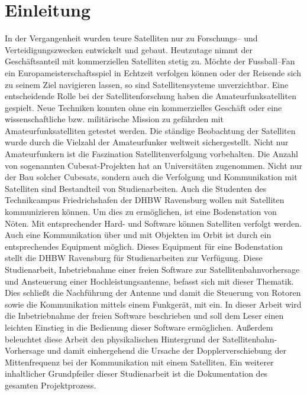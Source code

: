 
\chapter{Einleitung}
In der Vergangenheit wurden teure Satelliten nur zu Forschungs-- und Verteidigungszwecken entwickelt und gebaut. Heutzutage nimmt der 
Geschäftsanteil mit kommerziellen Satelliten stetig zu. Möchte der Fussball--Fan ein Europameisterschaftsspiel in Echtzeit verfolgen können oder der 
Reisende sich zu seinem Ziel navigieren lassen, so sind Satellitensysteme unverzichtbar.
\newpar
Eine entscheidende Rolle bei der Satellitenforschung haben die Amateurfunksatelliten 
gespielt. Neue Techniken konnten ohne ein kommerzielles Geschäft oder eine wissenschaftliche bzw. militärische Mission zu gefährden mit 
Amateurfunksatelliten getestet werden. Die ständige Beobachtung der Satelliten wurde durch die 
Vielzahl der Amateurfunker weltweit sichergestellt. Nicht nur Amateurfunkern ist die Faszination Satellitenverfolgung vorbehalten. Die Anzahl von 
sogenannten Cubesat-Projekten hat an Universitäten zugenommen. Nicht nur der Bau solcher Cubesats, sondern auch die Verfolgung und 
Kommunikation mit Satelliten sind Bestandteil von Studienarbeiten.
\newpar
Auch die Studenten des Technikcampus Friedrichshafen der DHBW Ravensburg wollen mit Satelliten kommunizieren können. Um dies zu ermöglichen, ist 
eine Bodenstation von Nöten. Mit entsprechender Hard- und Software können Satelliten verfolgt werden. Auch eine Kommunikation über und mit Objekten 
im Orbit ist durch ein entsprechendes Equipment möglich. 
\newpar
Dieses Equipment für eine Bodenstation stellt die DHBW Ravensburg für Studienarbeiten zur Verfügung. Diese Studienarbeit, Inbetriebnahme einer freien 
Software zur Satellitenbahnvorhersage und Ansteuerung einer Hochleistungsantenne, befasst sich mit dieser Thematik. Dies schließt die Nachführung 
der Antenne und damit die Steuerung von Rotoren sowie die Kommunikation mittels einem Funkgerät, mit ein. In dieser Arbeit wird die Inbetriebnahme 
der freien Software beschrieben und soll dem Leser einen leichten Einstieg in die Bedienung dieser Software ermöglichen. Außerdem beleuchtet diese 
Arbeit den physikalischen Hintergrund der Satellitenbahn-Vorhersage und damit einhergehend die Ursache der Dopplerverschiebung der Mittenfrequenz bei 
der Kommunikation mit einem Satelliten. Ein weiterer inhaltlicher Grundpfeiler dieser Studienarbeit ist die Dokumentation des gesamten Projektprozess. 
   
